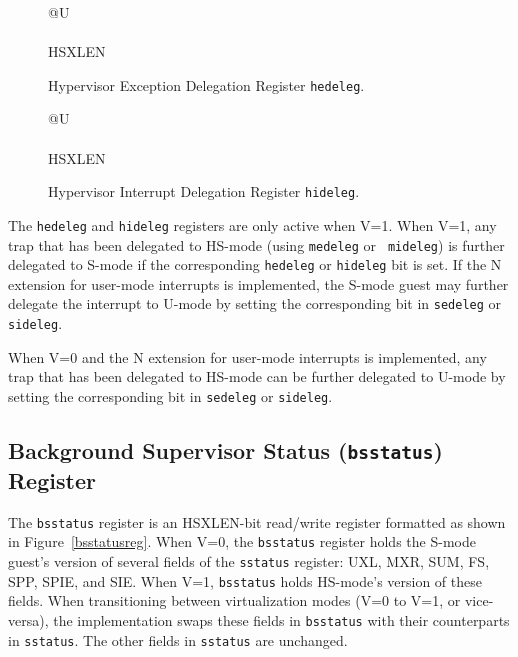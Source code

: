 \begin{figure}[h!]
{\footnotesize
\begin{center}
\begin{tabular}{@{}U}
 \\
\hline
{} \\
\hline
HSXLEN \\
\end{tabular}
\end{center}
}
\vspace{-0.1in}
\caption{Hypervisor Exception Delegation Register {\tt hedeleg}.}
\label{hedelegreg}
\end{figure}

\begin{figure}[h!]
{\footnotesize
\begin{center}
\begin{tabular}{@{}U}
 \\
\hline
{} \\
\hline
HSXLEN \\
\end{tabular}
\end{center}
}
\vspace{-0.1in}
\caption{Hypervisor Interrupt Delegation Register {\tt hideleg}.}
\label{hidelegreg}
\end{figure}

The {\tt hedeleg} and {\tt hideleg} registers are only active when V=1.  When
V=1, any trap that has been delegated to HS-mode (using {\tt medeleg} or {\tt
mideleg}) is further delegated to S-mode if the corresponding {\tt hedeleg} or
{\tt hideleg} bit is set.  If the N extension for user-mode interrupts
is implemented, the S-mode guest may further delegate the interrupt
to U-mode by setting the corresponding bit in {\tt sedeleg} or {\tt sideleg}.

When V=0 and the N extension for user-mode interrupts is implemented, any trap
that has been delegated to HS-mode can be further delegated to U-mode by
setting the corresponding bit in {\tt sedeleg} or {\tt sideleg}.

\subsection{Background Supervisor Status ({\tt bsstatus}) Register}

The {\tt bsstatus} register is an HSXLEN-bit read/write register formatted as
shown in Figure~\ref{bsstatusreg}.  When V=0, the {\tt bsstatus} register
holds the S-mode guest's version of several fields of the {\tt sstatus}
register: UXL, MXR, SUM, FS, SPP, SPIE, and SIE.  When V=1, {\tt bsstatus}
holds HS-mode's version of these fields.  When transitioning between
virtualization modes (V=0 to V=1, or vice-versa), the implementation swaps
these fields in {\tt bsstatus} with their counterparts in {\tt sstatus}.  The
other fields in {\tt sstatus} are unchanged.

